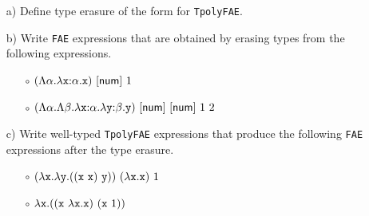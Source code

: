 \begin{enumerate}
\begin{itemize}
\item[a)]
  Define type erasure of the form  for \texttt{TpolyFAE}.
\end{itemize}

\begin{itemize}
\item[b)]
  Write \texttt{FAE} expressions that are obtained by erasing types from the
    following expressions.
    \begin{itemize}
      \item[$\circ$] $(\Lambda\alpha.\lambda \C{x}{:}\alpha.\C{x})\ [\textsf{num}]\ 1$
      \item[$\circ$]
        $(\Lambda\alpha.\Lambda\beta.\lambda\texttt{x}{:}\alpha.\lambda\texttt{y}{:}\beta.\texttt{y})
        \ [\textsf{num}]\ [\textsf{num}]\ 1\ 2$
    \end{itemize}
\end{itemize}

\begin{itemize}
\item[c)]
  Write well-typed \texttt{TpolyFAE} expressions that produce
    the following \texttt{FAE} expressions after the type erasure.
    \begin{itemize}
      \item[$\circ$] $(\lambda \C{x}.\lambda \C{y}.((\C{x}\ \C{x})\ \C{y}))\
        (\lambda \C{x}.\C{x})\ 1$
      \item[$\circ$] $\lambda \C{x}.((\C{x}\ \lambda \C{x}.\C{x})\ (\C{x}\ 1))$
    \end{itemize}
\end{itemize}

\end{enumerate}
